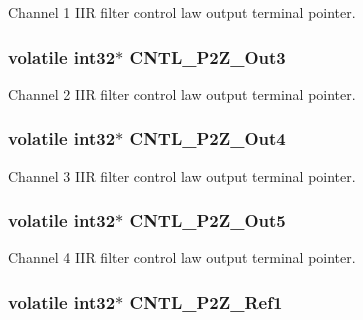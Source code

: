 Channel 1 I\-I\-R filter control law output terminal pointer. \hypertarget{a00010_a11dcb9f6b6d03fe960ddf790e1ad5ed2}{
\subsubsection[{C\-N\-T\-L\-\_\-2\-P2\-Z\-\_\-\-Out3}]{\setlength{\rightskip}{0pt plus 5cm}volatile int32$\ast$ C\-N\-T\-L\-\_\-P2\-Z\-\_\-\-Out3}}\label{a00010_a11dcb9f6b6d03fe960ddf790e1ad5ed2}
Channel 2 I\-I\-R filter control law output terminal pointer. \hypertarget{a00010_a253e4070b19470606e0566ff25fc911f}{
\subsubsection[{C\-N\-T\-L\-\_\-2\-P2\-Z\-\_\-\-Out4}]{\setlength{\rightskip}{0pt plus 5cm}volatile int32$\ast$ C\-N\-T\-L\-\_\-P2\-Z\-\_\-\-Out4}}\label{a00010_a253e4070b19470606e0566ff25fc911f}
Channel 3 I\-I\-R filter control law output terminal pointer. \hypertarget{a00010_a3b336a91d25a7feb9f8927b32b800d0d}{
\subsubsection[{C\-N\-T\-L\-\_\-2\-P2\-Z\-\_\-\-Out5}]{\setlength{\rightskip}{0pt plus 5cm}volatile int32$\ast$ C\-N\-T\-L\-\_\-P2\-Z\-\_\-\-Out5}}\label{a00010_a3b336a91d25a7feb9f8927b32b800d0d}
Channel 4 I\-I\-R filter control law output terminal pointer. \hypertarget{a00010_a98527ce76f5175fa2933d46f324d85fb}{
\subsubsection[{C\-N\-T\-L\-\_\-2\-P2\-Z\-\_\-\-Ref1}]{\setlength{\rightskip}{0pt plus 5cm}volatile int32$\ast$ C\-N\-T\-L\-\_\-P2\-Z\-\_\-\-Ref1}}\label{a00010_a98527ce76f5175fa2933d46f324d85fb}
